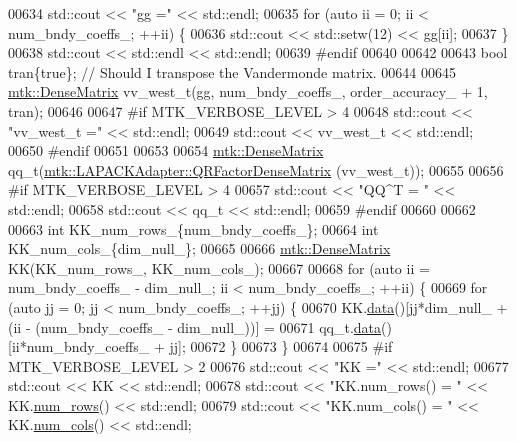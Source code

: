 \begin{DoxyCode}
{{00634   std::cout << \textcolor{stringliteral}{"gg ="} << std::endl;
00635   \textcolor{keywordflow}{for} (\textcolor{keyword}{auto} ii = 0; ii < num\_bndy\_coeffs\_; ++ii) \{
00636     std::cout << std::setw(12) << gg[ii];
00637   \}
00638   std::cout << std::endl << std::endl;
00639 \textcolor{preprocessor}{  #endif}
00640 
00642 
00643   \textcolor{keywordtype}{bool} tran\{\textcolor{keyword}{true}\}; \textcolor{comment}{// Should I transpose the Vandermonde matrix.}
00644 
00645   \hyperlink{classmtk_1_1DenseMatrix}{mtk::DenseMatrix} vv\_west\_t(gg, num\_bndy\_coeffs\_, order\_accuracy\_ + 1, tran);
00646 
00647 \textcolor{preprocessor}{  #if MTK\_VERBOSE\_LEVEL > 4}
00648   std::cout << \textcolor{stringliteral}{"vv\_west\_t ="} << std::endl;
00649   std::cout << vv\_west\_t << std::endl;
00650 \textcolor{preprocessor}{  #endif}
00651 
00653 
00654   \hyperlink{classmtk_1_1DenseMatrix}{mtk::DenseMatrix} qq\_t(\hyperlink{classmtk_1_1LAPACKAdapter_ae5c6e78c9c819c9ac7a6f31bfd011d7a}{mtk::LAPACKAdapter::QRFactorDenseMatrix}
      (vv\_west\_t));
00655 
00656 \textcolor{preprocessor}{  #if MTK\_VERBOSE\_LEVEL > 4}
00657   std::cout << \textcolor{stringliteral}{"QQ^T = "} << std::endl;
00658   std::cout << qq\_t << std::endl;
00659 \textcolor{preprocessor}{  #endif}
00660 
00662 
00663   \textcolor{keywordtype}{int} KK\_num\_rows\_\{num\_bndy\_coeffs\_\};
00664   \textcolor{keywordtype}{int} KK\_num\_cols\_\{dim\_null\_\};
00665 
00666   \hyperlink{classmtk_1_1DenseMatrix}{mtk::DenseMatrix} KK(KK\_num\_rows\_, KK\_num\_cols\_);
00667 
00668   \textcolor{keywordflow}{for} (\textcolor{keyword}{auto} ii = num\_bndy\_coeffs\_ - dim\_null\_; ii < num\_bndy\_coeffs\_; ++ii) \{
00669     \textcolor{keywordflow}{for} (\textcolor{keyword}{auto} jj = 0; jj < num\_bndy\_coeffs\_; ++jj) \{
00670       KK.\hyperlink{classmtk_1_1DenseMatrix_a0c33b8a9e01d157c61ddbdf807c25d84}{data}()[jj*dim\_null\_ + (ii - (num\_bndy\_coeffs\_ - dim\_null\_))] =
00671           qq\_t.\hyperlink{classmtk_1_1DenseMatrix_a0c33b8a9e01d157c61ddbdf807c25d84}{data}()[ii*num\_bndy\_coeffs\_ + jj];
00672     \}
00673   \}
00674 
00675 \textcolor{preprocessor}{  #if MTK\_VERBOSE\_LEVEL > 2}
00676   std::cout << \textcolor{stringliteral}{"KK ="} << std::endl;
00677   std::cout << KK << std::endl;
00678   std::cout << \textcolor{stringliteral}{"KK.num\_rows() = "} << KK.\hyperlink{classmtk_1_1DenseMatrix_a53f3afb3b6a8d21854458aaa9663cc74}{num\_rows}() << std::endl;
00679   std::cout << \textcolor{stringliteral}{"KK.num\_cols() = "} << KK.\hyperlink{classmtk_1_1DenseMatrix_a41747502d468c6728a4be31501b16e0e}{num\_cols}() << std::endl;
}}
\end{DoxyCode}
